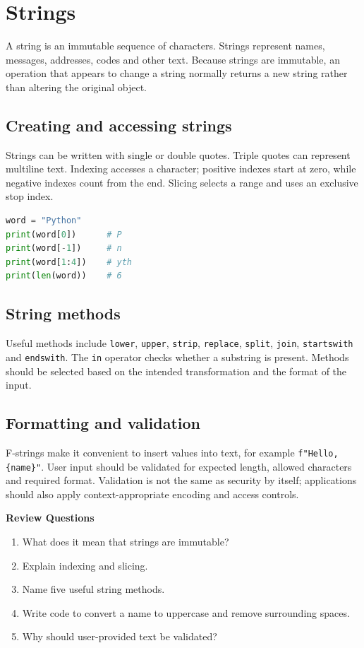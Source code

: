 \documentclass[11pt,openany,oneside]{book}
\newcommand{\reviewtitle}{\par\noindent\textbf{\color{Navy}Review Questions}\par}
\begin{document}
\chapter{Strings}
A string is an immutable sequence of characters. Strings represent names, messages, addresses, codes and other text. Because strings are immutable, an operation that appears to change a string normally returns a new string rather than altering the original object.

\section{Creating and accessing strings}
Strings can be written with single or double quotes. Triple quotes can represent multiline text. Indexing accesses a character; positive indexes start at zero, while negative indexes count from the end. Slicing selects a range and uses an exclusive stop index.

\begin{lstlisting}[style=webcode,language=Python]
word = "Python"
print(word[0])      # P
print(word[-1])     # n
print(word[1:4])    # yth
print(len(word))    # 6
\end{lstlisting}

\section{String methods}
Useful methods include \texttt{lower}, \texttt{upper}, \texttt{strip}, \texttt{replace}, \texttt{split}, \texttt{join}, \texttt{startswith} and \texttt{endswith}. The \texttt{in} operator checks whether a substring is present. Methods should be selected based on the intended transformation and the format of the input.

\section{Formatting and validation}
F-strings make it convenient to insert values into text, for example \texttt{f"Hello, \{name\}"}. User input should be validated for expected length, allowed characters and required format. Validation is not the same as security by itself; applications should also apply context-appropriate encoding and access controls.

\reviewtitle
\begin{enumerate}
\item What does it mean that strings are immutable?
\item Explain indexing and slicing.
\item Name five useful string methods.
\item Write code to convert a name to uppercase and remove surrounding spaces.
\item Why should user-provided text be validated?
\end{enumerate}
\end{document}
